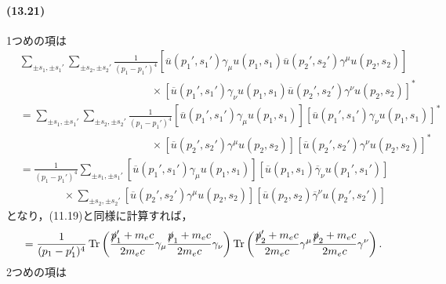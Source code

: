 \paragraph{(13.21)}
1つめの項は
\begin{align*}
  & \sum_{\pm s_1, \pm s_1'} \sum_{\pm s_2, \pm s_2'} \frac{1}{(p_1-p_1')^4} \left[ \overline{u}(p_1',s_1') \gamma_\mu u(p_1, s_1) \overline{u}(p_2',s_2') \gamma^\mu u(p_2, s_2) \right] \\
  & \qquad\qquad\qquad\qquad\qquad\qquad \times \left[ \overline{u}(p_1',s_1') \gamma_\nu u(p_1, s_1) \overline{u}(p_2',s_2') \gamma^\nu u(p_2, s_2) \right]^* \\
  & = \sum_{\pm s_1, \pm s_1'} \sum_{\pm s_2, \pm s_2'} \frac{1}{(p_1-p_1')^4} \left[ \overline{u}(p_1',s_1') \gamma_\mu u(p_1, s_1) \right] \left[ \overline{u}(p_1',s_1') \gamma_\nu u(p_1, s_1) \right]^* \\
  & \qquad\qquad\qquad\qquad\qquad\qquad \times \left[ \overline{u}(p_2',s_2') \gamma^\mu u(p_2, s_2) \right] \left[ \overline{u}(p_2',s_2') \gamma^\nu u(p_2, s_2) \right]^* \\
  & = \frac{1}{(p_1-p_1')^4} \sum_{\pm s_1, \pm s_1'} \left[ \overline{u}(p_1',s_1') \gamma_\mu u(p_1, s_1) \right] \left[ \overline{u}(p_1, s_1) \overline{\gamma}_\nu u(p_1', s_1') \right] \\
  & \qquad\qquad \times \sum_{\pm s_2, \pm s_2'}\left[ \overline{u}(p_2',s_2') \gamma^\mu u(p_2, s_2) \right] \left[ \overline{u}(p_2,s_2) \overline{\gamma}^\nu u(p_2', s_2') \right]
\end{align*}
となり，(11.19)と同様に計算すれば，
\[=\frac{1}{(p_1-p_1')^4} \operatorname{Tr} \left( \frac{\slashed{p}_1'+m_ec}{2m_ec} \gamma_\mu \frac{\slashed{p}_1+m_ec}{2m_ec} \gamma_\nu \right) \operatorname{Tr} \left( \frac{\slashed{p}_2'+m_ec}{2m_ec} \gamma^\mu \frac{\slashed{p}_2+m_ec}{2m_ec} \gamma^\nu \right). \]
2つめの項は

